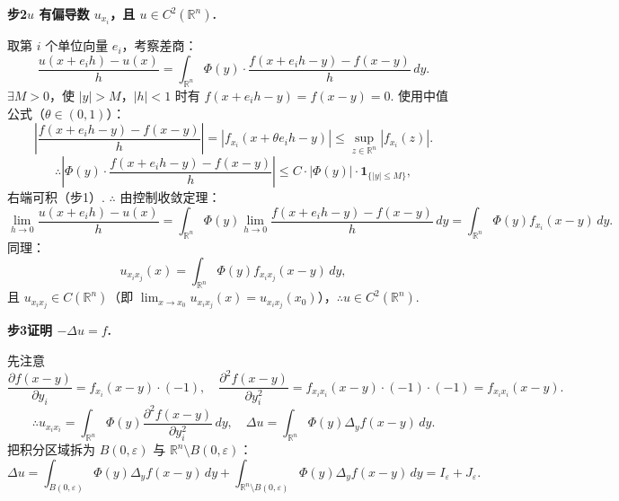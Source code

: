 \documentclass{article}
\begin{document}
\noindent\textbf{步2\quad $u$ 有偏导数 $u_{x_i}$，且 $u \in C^2(\mathbb{R}^n)$.}

取第 $i$ 个单位向量 $e_i$，考察差商：
\[
\frac{u(x+e_i h) - u(x)}{h} = \int_{\mathbb{R}^n} \Phi(y) \cdot \frac{f(x+e_i h - y) - f(x-y)}{h}\, dy.
\]
$\exists M>0$，使 $|y|>M$，$|h|<1$ 时有 $f(x+e_i h - y) = f(x-y) = 0$. 使用中值公式（$\theta \in (0,1)$）：
\[
\left| \frac{f(x+e_i h - y) - f(x-y)}{h} \right| = |f_{x_i}(x + \theta e_i h - y)| \leq \sup_{z \in \mathbb{R}^n} |f_{x_i}(z)|.
\]
\[
\therefore \left| \Phi(y) \cdot \frac{f(x+e_i h - y) - f(x-y)}{h} \right| \leq C \cdot |\Phi(y)| \cdot \mathbf{1}_{\{|y| \leq M\}},
\]
右端可积（步1）. $\therefore$ 由控制收敛定理：
\[
\lim_{h \to 0} \frac{u(x+e_i h) - u(x)}{h} = \int_{\mathbb{R}^n} \Phi(y) \lim_{h \to 0} \frac{f(x+e_i h - y) - f(x-y)}{h}\, dy = \int_{\mathbb{R}^n} \Phi(y) f_{x_i}(x-y)\, dy.
\]
同理：
\[
u_{x_i x_j}(x) = \int_{\mathbb{R}^n} \Phi(y) f_{x_i x_j}(x-y)\, dy,
\]
且 $u_{x_i x_j} \in C(\mathbb{R}^n)$（即 $\lim_{x \to x_0} u_{x_i x_j}(x) = u_{x_i x_j}(x_0)$），$\therefore u \in C^2(\mathbb{R}^n)$.

\noindent\textbf{步3\quad 证明 $-\Delta u = f$.}

先注意
\[
\frac{\partial f(x-y)}{\partial y_i} = f_{x_i}(x-y) \cdot (-1), \quad \frac{\partial^2 f(x-y)}{\partial y_i^2} = f_{x_i x_i}(x-y) \cdot (-1) \cdot (-1) = f_{x_i x_i}(x-y).
\]
\[
\therefore u_{x_i x_i} = \int_{\mathbb{R}^n} \Phi(y) \frac{\partial^2 f(x-y)}{\partial y_i^2}\, dy, \quad \Delta u = \int_{\mathbb{R}^n} \Phi(y) \Delta_y f(x-y)\, dy.
\]
把积分区域拆为 $B(0,\varepsilon)$ 与 $\mathbb{R}^n \setminus B(0,\varepsilon)$：
\[
\Delta u = \int_{B(0,\varepsilon)} \Phi(y) \Delta_y f(x-y)\, dy + \int_{\mathbb{R}^n \setminus B(0,\varepsilon)} \Phi(y) \Delta_y f(x-y)\, dy = I_\varepsilon + J_\varepsilon.
\]
\end{document}
